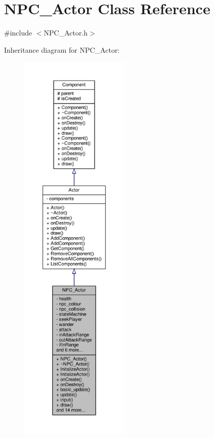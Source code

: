 \hypertarget{classNPC__Actor}{}\section{N\+P\+C\+\_\+\+Actor Class Reference}
\label{classNPC__Actor}


{\ttfamily \#include $<$N\+P\+C\+\_\+\+Actor.\+h$>$}



Inheritance diagram for N\+P\+C\+\_\+\+Actor\+:
\nopagebreak
\begin{figure}[H]
\begin{center}
\leavevmode
\includegraphics[height=550pt]{classNPC__Actor__inherit__graph}
\end{center}
\end{figure}


